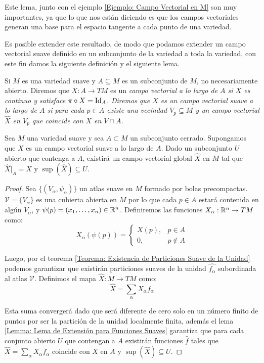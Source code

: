 Este lema, junto con el ejemplo \ref{Ejemplo: Campo Vectorial en M} son muy importantes, ya que lo que nos están diciendo es que los campos vectoriales generan una base para el espacio tangente a cada punto de una variedad.

Es posible extender este resultado, de modo que podamos extender un campo vectorial suave definido en un subconjunto de la variedad a toda la variedad, con este fin damos la siguiente definición y el siguiente lema.

\begin{definition}
	Si $M$ es una variedad suave y $A \subseteq M$ es un subconjunto de $M$, no necesariamente abierto. Diremos que $X: A \to TM$ es un \it{campo vectorial a lo largo de $A$} si $X$ es continuo y satisface $\pi \circ X = \mathrm{Id}_{A}$. Diremos que $X$ es un \it{campo vectorial suave a lo largo de $A$} si para cada $p \in A$ existe una vecindad $V_p \subseteq M$ y un campo vectorial $\hat{X}$ en $V_p$ que coincide con $X$ en $V \cap A$.
\end{definition}

\begin{lemma}
	Sea $M$ una variedad suave y sea $A \subset M$ un subconjunto cerrado. Supongamos que $X$ es un campo vectorial suave a lo largo de $A$. Dado un subconjunto $U$ abierto que contenga a $A$, existirá un campo vectorial global $\hat{X}$ en $M$ tal que $\hat{X}|_{A} = X$ y $\sup(\hat{X}) \subseteq U$.
\end{lemma}

\begin{proof}
	Sea $\{(V_\alpha,\psi_\alpha)\}$ un atlas suave en $M$ formado por bolas precompactas. $\mathcal{V}=\{V_\alpha\}$ es una cubierta abierta en $M$ por lo que cada $p \in A$ estará contenida en algún $V_\alpha$, y $\psi(p) = (x_1,\dots,x_n) \in \mathbb{R}^n$. Definiremos las funciones $X_\alpha: \mathbb{R}^n \to TM$ como:
	\[
		X_{\alpha}(\psi(p)) = \begin{cases}
			X(p), & p \in A    \\
			0,    & p \notin A
		\end{cases}
	\]

	Luego, por el teorema \ref{Teorema: Existencia de Particiones Suave de la Unidad} podemos garantizar que existirán particiones suaves de la unidad $\hat{f_\alpha}$ subordinada al atlas $\mathcal{V}$. Definimos el mapa $\hat{X}: M \to TM$ como:
	\[
		\hat{X} = \sum_{\alpha} X_{\alpha}f_\alpha
	\]

	Esta suma convergerá dado que será diferente de cero solo en un número finito de puntos por ser la partición de la unidad localmente finita, además el lema \ref{Lemma: Lema de Extensión para Funciones Suaves} garantiza que para cada conjunto abierto $U$ que contengan a $A$ existirán funciones $\hat{f}$ tales que $\hat{X} = \sum_\alpha  X_\alpha f_\alpha$ coincide con $X$ en $A$ y $\sup(\hat{X}) \subseteq U$.
\end{proof}


